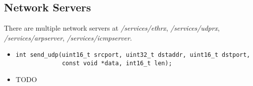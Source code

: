 \documentclass[letterpaper]{article}
\begin{document}
\subsection{Network Servers}
There are multiple network servers at \emph{/services/ethrx},
\emph{/services/udprx}, \emph{/services/arpserver}, \emph{/services/icmpserver}.
\begin{itemize}
\item \begin{verbatim}
int send_udp(uint16_t srcport, uint32_t dstaddr, uint16_t dstport,
             const void *data, int16_t len);\end{verbatim}
\item TODO
\end{itemize}
\end{document}
